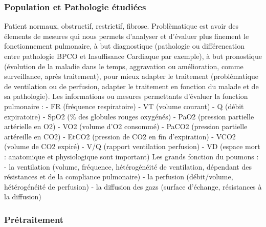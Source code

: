 \documentclass[12pt,]{article}
\begin{document}
\hypertarget{population-et-pathologie-uxe9tudiuxe9es}{%
\subsubsection{Population et Pathologie
étudiées}\label{population-et-pathologie-uxe9tudiuxe9es}}

Patient normaux, obstructif, restrictif, fibrose. Problèmatique est
avoir des élements de mesures qui nous permets d'analyser et d'évaluer
plus finement le fonctionnement pulmonaire, à but diagnostique
(pathologie ou différencation entre pathologie BPCO et Insuffisance
Cardiaque par exemple), à but pronostique (évolution de la maladie dans
le temps, aggravation ou amélioration, comme surveillance, après
traitement), pour mieux adapter le traitement (problématique de
ventilation ou de perfusion, adapter le traitement en fonction du malade
et de sa pathologie). Les informations ou mesures permettants d'évaluer
la fonction pulmonaire : - FR (fréquence respiratoire) - VT (volume
courant) - Q (débit expiratoire) - SpO2 (\% des globules rouges
oxygénés) - PaO2 (pression partielle artérielle en O2) - VO2 (volume
d'O2 consommé) - PaCO2 (pression partielle artéreille en CO2) - EtCO2
(pression de CO2 en fin d'expiration) - VCO2 (volume de CO2 expiré) -
V/Q (rapport ventilation perfusion) - VD (espace mort : anatomique et
physiologique sont important) Les grands fonction du poumons : - la
ventilation (volume, fréquence, hétérogénéité de ventilation, dépendant
des résistances et de la compliance pulmonaire) - la perfusion
(débit/volume, hétérogénéité de perfusion) - la diffusion des gazs
(surface d'échange, résistances à la diffusion)

\hypertarget{pruxe9traitement}{%
\subsubsection{Prétraitement}\label{pruxe9traitement}}
\end{document}
